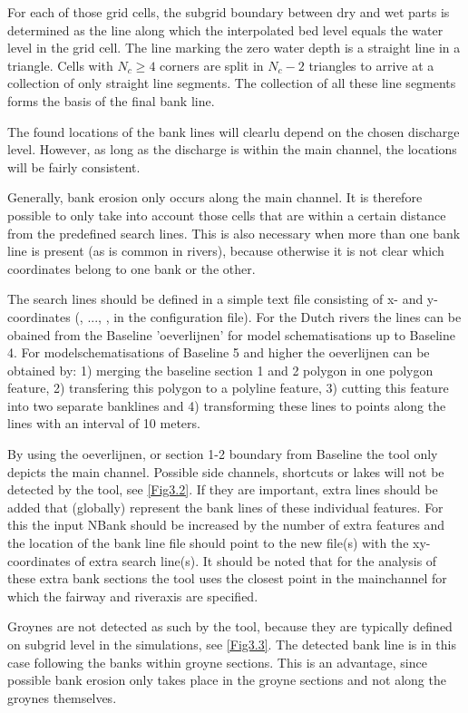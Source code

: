 For each of those grid cells, the subgrid boundary between dry and wet parts is determined as the line along which the interpolated bed level equals the water level in the grid cell.
The line marking the zero water depth is a straight line in a triangle.
Cells with $N_c \ge 4$ corners are split in $N_c - 2$ triangles to arrive at a collection of only straight line segments.
The collection of all these line segments forms the basis of the final bank line.

The found locations of the bank lines will clearlu depend on the chosen discharge level.
However, as long as the discharge is within the main channel, the locations will be fairly consistent.

Generally, bank erosion only occurs along the main channel.
It is therefore possible to only take into account those cells that are within a certain distance from the predefined search lines.
This is also necessary when more than one bank line is present (as is common in rivers), because otherwise it is not clear which coordinates belong to one bank or the other.

The search lines should be defined in a simple text file consisting of x- and y- coordinates (, ..., , in the configuration file). For the Dutch rivers the lines can be obained from the Baseline 'oeverlijnen' for model schematisations up to Baseline 4. For modelschematisations of Baseline 5 and higher the oeverlijnen can be obtained by: 1) merging the baseline section 1 and 2 polygon in one polygon feature, 2) transfering this polygon to a polyline feature, 3) cutting this feature into two separate banklines and 4) transforming these lines to points along the lines with an interval of 10 meters.

By using the oeverlijnen, or section 1-2 boundary from Baseline the tool only depicts the main channel. Possible side channels, shortcuts or lakes will not be detected by the tool, see \autoref{Fig3.2}.
If they are important, extra lines should be added that (globally) represent the bank lines of these individual features. For this the input NBank should be increased by the number of extra features and the location of the bank line file  should point to the new file(s) with the xy-coordinates of extra search line(s). It should be noted that for the analysis of these extra bank sections the tool uses the closest point in the mainchannel for which the fairway and riveraxis are specified.

Groynes are not detected as such by the tool, because they are typically defined on subgrid level in the simulations, see \autoref{Fig3.3}.
The detected bank line is in this case following the banks within groyne sections.
This is an advantage, since possible bank erosion only takes place in the groyne sections and not along the groynes themselves.

